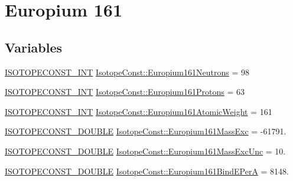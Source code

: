 \hypertarget{group___isotope_const-_europium-_eu161}{}\section{Europium 161}
\label{group___isotope_const-_europium-_eu161}
\subsection*{Variables}
\begin{DoxyCompactItemize}
\item 
\mbox{\hyperlink{group___isotope_const-_macros_ga5f18360b3e99483a35c32d789e62621c}{I\+S\+O\+T\+O\+P\+E\+C\+O\+N\+S\+T\+\_\+\+I\+NT}} \mbox{\hyperlink{group___isotope_const-_europium-_eu161_ga348bc83f509691f9696b8c0420e5daf1}{Isotope\+Const\+::\+Europium161\+Neutrons}} = 98
\item 
\mbox{\hyperlink{group___isotope_const-_macros_ga5f18360b3e99483a35c32d789e62621c}{I\+S\+O\+T\+O\+P\+E\+C\+O\+N\+S\+T\+\_\+\+I\+NT}} \mbox{\hyperlink{group___isotope_const-_europium-_eu161_gabc67adb85e16192f288e9e7f56325f75}{Isotope\+Const\+::\+Europium161\+Protons}} = 63
\item 
\mbox{\hyperlink{group___isotope_const-_macros_ga5f18360b3e99483a35c32d789e62621c}{I\+S\+O\+T\+O\+P\+E\+C\+O\+N\+S\+T\+\_\+\+I\+NT}} \mbox{\hyperlink{group___isotope_const-_europium-_eu161_ga2c9a89b6d00e1fe6a93e5172e260bfa7}{Isotope\+Const\+::\+Europium161\+Atomic\+Weight}} = 161
\item 
\mbox{\hyperlink{group___isotope_const-_macros_ga8f45a7272ce02c0b4c65c44636ed719a}{I\+S\+O\+T\+O\+P\+E\+C\+O\+N\+S\+T\+\_\+\+D\+O\+U\+B\+LE}} \mbox{\hyperlink{group___isotope_const-_europium-_eu161_ga845b5ac37642bb67b3b6be4068cde093}{Isotope\+Const\+::\+Europium161\+Mass\+Exc}} = -\/61791.
\item 
\mbox{\hyperlink{group___isotope_const-_macros_ga8f45a7272ce02c0b4c65c44636ed719a}{I\+S\+O\+T\+O\+P\+E\+C\+O\+N\+S\+T\+\_\+\+D\+O\+U\+B\+LE}} \mbox{\hyperlink{group___isotope_const-_europium-_eu161_ga678170ed66a5f1aaeca4996779f5c35c}{Isotope\+Const\+::\+Europium161\+Mass\+Exc\+Unc}} = 10.
\item 
\mbox{\hyperlink{group___isotope_const-_macros_ga8f45a7272ce02c0b4c65c44636ed719a}{I\+S\+O\+T\+O\+P\+E\+C\+O\+N\+S\+T\+\_\+\+D\+O\+U\+B\+LE}} \mbox{\hyperlink{group___isotope_const-_europium-_eu161_ga9eb8139779d7ec6be313cdae2b46c4c9}{Isotope\+Const\+::\+Europium161\+Bind\+E\+PerA}} = 8148.
\item 

\end{DoxyCompactItemize}
